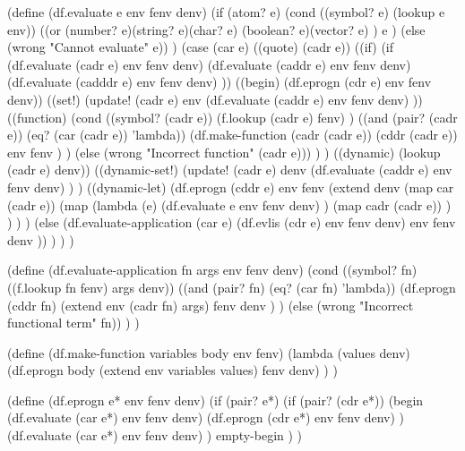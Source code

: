 \begin{code:lisp}
(define (df.evaluate e env fenv denv)
  (if (atom? e)
      (cond ((symbol? e) (lookup e env))
            ((or (number? e)(string? e)(char? e)
                 (boolean? e)(vector? e) )
             e )
            (else (wrong "Cannot evaluate" e)) )
      (case (car e)
        ((quote)  (cadr e))
        ((if)     (if (df.evaluate (cadr e) env fenv denv)
                      (df.evaluate (caddr e) env fenv denv)
                      (df.evaluate (cadddr e) env fenv denv) ))
        ((begin)  (df.eprogn (cdr e) env fenv denv))
        ((set!)   (update! (cadr e)
                           env
                           (df.evaluate (caddr e) env fenv denv) ))
        ((function)
         (cond ((symbol? (cadr e))
                (f.lookup (cadr e) fenv) )
               ((and (pair? (cadr e)) (eq? (car (cadr e)) 'lambda))
                (df.make-function
                 (cadr (cadr e)) (cddr (cadr e)) env fenv ) )
               (else (wrong "Incorrect function" (cadr e))) ) )
        ((dynamic) (lookup (cadr e) denv))
        ((dynamic-set!)
         (update! (cadr e)
                  denv
                  (df.evaluate (caddr e) env fenv denv) ) )
        ((dynamic-let)
         (df.eprogn (cddr e)
                    env
                    fenv
                    (extend denv
                            (map car (cadr e))
                            (map (lambda (e)
                                   (df.evaluate e env fenv denv) )
                                 (map cadr (cadr e)) ) ) ) )
        (else (df.evaluate-application (car e)
                                       (df.evlis (cdr e) env fenv denv)
                                       env
                                       fenv
                                       denv )) ) ) )

(define (df.evaluate-application fn args env fenv denv)
  (cond ((symbol? fn) ((f.lookup fn fenv) args denv))
        ((and (pair? fn) (eq? (car fn) 'lambda))
         (df.eprogn (cddr fn)
                    (extend env (cadr fn) args)
                    fenv
                    denv ) )
        (else (wrong "Incorrect functional term" fn)) ) )

(define (df.make-function variables body env fenv)
  (lambda (values denv)
    (df.eprogn body (extend env variables values) fenv denv) ) )

(define (df.eprogn e* env fenv denv)
  (if (pair? e*)
      (if (pair? (cdr e*))
          (begin (df.evaluate (car e*) env fenv denv)
                 (df.eprogn (cdr e*) env fenv denv) )
          (df.evaluate (car e*) env fenv denv) )
      empty-begin ) )
\end{code:lisp}

